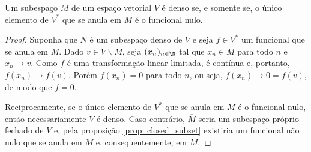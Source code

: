 \begin{teo}
    Um subespaço \( M \) de um espaço vetorial \( V \) é denso se, e somente se, o único elemento de \( V^{ * } \) que se anula em \( M \) é o funcional nulo.
\end{teo}
\begin{proof}
    Suponha que \( N \) é um subespaço denso de \( V \) e seja \( f \in V^{ * } \) um funcional que se anula em \( M \).
    Dado \( v \in V \backslash M \), seja \( ( x_{ n } )_{ n \in \N } \) tal que \( x_{ n } \in M \) para todo \( n \) e \( x_{ n } \to v \).
    Como \( f \) é uma transformação linear limitada, é contínua e, portanto, \( f(x_{ n }) \to f(v) \).
    Porém \( f(x_{ n }) = 0 \) para todo \( n \), ou seja, \( f(x_{ n }) \to 0 = f(v) \), de modo que \( f = 0 \).

    Reciprocamente, se o único elemento de \( V^{ * } \) que se anula em \( M \) é o funcional nulo, então necessariamente \( V \) é denso.
    Caso contrário, \( \overline{M} \) seria um subespaço próprio fechado de \( V \) e, pela proposição \ref{prop: closed_subset} existiria um funcional não nulo que se anula em \( \overline{M} \) e, consequentemente, em \( M \).
\end{proof}